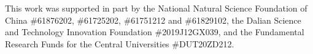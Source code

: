 \documentclass[sigconf]{acmart}
\begin{document}
\begin{acks}
This work was supported in part by the National Natural Science Foundation of China \#61876202, \#61725202, \#61751212 and \#61829102,
the Dalian Science and Technology Innovation Foundation \#2019J12GX039, 
and the Fundamental Research Funds for the Central Universities \#DUT20ZD212. 
\end{acks}













\end{document}
